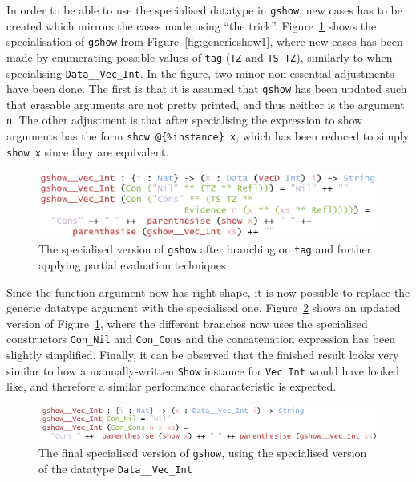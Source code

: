 \documentclass{ituthesis}
\newcommand{\ttconstructor}[1]{\textcolor{constructor-color}{\texttt{#1}}}
\newcommand{\tttype}[1]{\textcolor{type-color}{\texttt{#1}}}
\newcommand{\ttdec}[1]{\textcolor{declared-var-color}{\texttt{#1}}}
\newcommand{\ttvar}[1]{\textcolor{local-var-color}{\texttt{#1}}}
\newcommand{\ttliteral}[1]{\textcolor{literal-color}{\texttt{#1}}}
\theoremstyle{break}
\begin{document}
In order to be able to use the specialised datatype in \ttdec{gshow}, new cases has to be created which mirrors the cases made using ``the trick''.
Figure~\ref{fig:genericshow2} shows the specialisation of \ttdec{gshow} from Figure~\ref{fig:genericshow1}, where new cases has been made by enumerating possible values of \ttvar{tag} (\ttconstructor{TZ} and \ttconstructor{TS TZ}), similarly to when specialising \tttype{Data\_\_Vec\_Int}.
In the figure, two minor non-essential adjustments have been done. 
The first is that it is assumed that \ttdec{gshow} has been updated such that erasable arguments are not pretty printed, and thus neither is the argument \ttvar{n}.
The other adjustment is that after specialising the expression to show arguments has the form \ttdec{show}~\texttt{@\{}\ttliteral{\%instance}\texttt{\}}~\ttvar{x}, which has been reduced to simply \ttdec{show}~\ttvar{x} since they are equivalent.

\begin{figure}[ht]
\begin{center}
    \includegraphics[scale=0.5]{Figures/PEGenericShow2.png}
\end{center}
\caption{The specialised version of \ttdec{gshow} after branching on \ttvar{tag} and further applying partial evaluation techniques}
\label{fig:genericshow2}
\end{figure}

Since the function argument now has right shape, it is now possible to replace the generic datatype argument with the specialised one.
Figure~\ref{fig:genericshow3} shows an updated version of Figure~\ref{fig:genericshow2}, where the different branches now uses the specialised constructors \ttconstructor{Con\_Nil} and \ttconstructor{Con\_Cons} and the concatenation expression has been slightly simplified.
Finally, it can be observed that the finished result looks very similar to how a manually-written \tttype{Show} instance for \tttype{Vec}~\tttype{Int} would have looked like, and therefore a similar performance characteristic is expected.

\begin{figure}[ht]
\begin{center}
    \includegraphics[scale=0.5]{Figures/PEGenericShow3.png}
\end{center}
\caption{The final specialised version of \ttdec{gshow}, using the specialised version of the datatype \tttype{Data\_\_Vec\_Int}}
\label{fig:genericshow3}
\end{figure}
\end{document}
